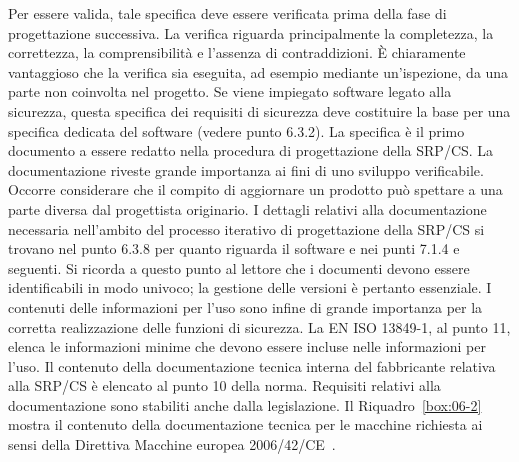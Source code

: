 Per essere valida, tale specifica deve essere verificata prima della fase di progettazione successiva. La verifica riguarda principalmente la completezza, la correttezza, la comprensibilità e l'assenza di contraddizioni. È chiaramente vantaggioso che la verifica sia eseguita, ad esempio mediante un'ispezione, da una parte non coinvolta nel progetto. Se viene impiegato software legato alla sicurezza, questa specifica dei requisiti di sicurezza deve costituire la base per una specifica dedicata del software (vedere punto 6.3.2).
La specifica è il primo documento a essere redatto nella procedura di progettazione della SRP/CS. La documentazione riveste grande importanza ai fini di uno sviluppo verificabile. Occorre considerare che il compito di aggiornare un prodotto può spettare a una parte diversa dal progettista originario. I dettagli relativi alla documentazione necessaria nell'ambito del processo iterativo di progettazione della SRP/CS si trovano nel punto 6.3.8 per quanto riguarda il software e nei punti 7.1.4 e seguenti. Si ricorda a questo punto al lettore che i documenti devono essere identificabili in modo univoco; la gestione delle versioni è pertanto essenziale. I contenuti delle informazioni per l'uso sono infine di grande importanza per la corretta realizzazione delle funzioni di sicurezza. La EN ISO 13849-1, al punto 11, elenca le informazioni minime che devono essere incluse nelle informazioni per l'uso. Il contenuto della documentazione tecnica interna del fabbricante relativa alla SRP/CS è elencato al punto 10 della norma. Requisiti relativi alla documentazione sono stabiliti anche dalla legislazione. Il Riquadro~\ref{box:06-2} mostra il contenuto della documentazione tecnica per le macchine richiesta ai sensi della Direttiva Macchine europea 2006/42/CE~\cite{dir2006-42-ce}.

